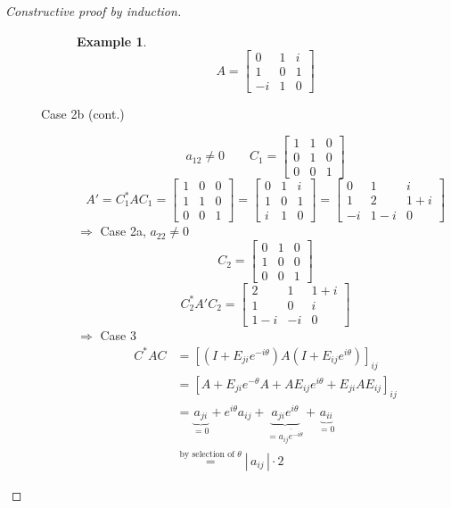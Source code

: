 \documentclass[a4paper,landscape,twocolumn]{article}
\newcommand\abs[1]{|\,#1\,|}
\newtheorem{ex}{Example}
\begin{document}
\begin{proof}[Constructive proof by induction]
\begin{description}
\begin{description}
          \begin{ex}
            \label{example-8.25}
            \[
              A = \begin{bmatrix}
                0 & 1 & i \\
                1 & 0 & 1 \\
                -i & 1 & 0
              \end{bmatrix}
            \]
          \end{ex}
        \item[Case 2b (cont.)]
          \[ a_{12} \neq 0 \qquad C_1 = \begin{bmatrix} 1 & 1 & 0 \\ 0 & 1 & 0 \\ 0 & 0 & 1 \end{bmatrix} \]
          \[
            A' = C_1^* A C_1 =
            \begin{bmatrix} 1 & 0 & 0 \\ 1 & 1 & 0 \\ 0 & 0 & 1 \end{bmatrix}
            = \begin{bmatrix} 0 & 1 & i \\ 1 & 0 & 1 \\ i & 1 & 0 \end{bmatrix}
            = \begin{bmatrix} 0 & 1 & i \\ 1 & 2 & 1+i \\ -i & 1-i & 0 \end{bmatrix}
          \]
          $\Rightarrow$ Case 2a, $a_{22} \neq 0$
          \[ C_2 = \begin{bmatrix} 0 & 1 & 0 \\ 1 & 0 & 0 \\ 0 & 0 & 1 \end{bmatrix} \]
          \[ C_2^* A' C_2 = \begin{bmatrix} 2 & 1 & 1+i \\ 1 & 0 & i \\ 1-i & -i & 0 \end{bmatrix} \]
          $\Rightarrow$ Case 3
          \begin{align*}
            C^* A C
              &= \left[\left(I + E_{ji} e^{-i\theta}\right) A \left(I + E_{ij} e^{i\theta}\right)\right]_{ij} \\
              &= \left[A + E_{ji} e^{-\theta} A + A E_{ij} e^{i\theta} + E_{ji} A E_{ij}\right]_{ij} \\
              &= \underbrace{a_{ji}}_{=0} + e^{i\theta} a_{ij} + \underbrace{a_{ji} e^{i\theta}}_{= \overline{a_{ij} e^{-i\theta}}} + \underbrace{a_{ii}}_{=0} \\
              &\overset{\text{by selection of } \theta}{=} \abs{a_{ij}} \cdot 2
          \end{align*}


\end{description}
\end{description}
\end{proof}
\end{document}
